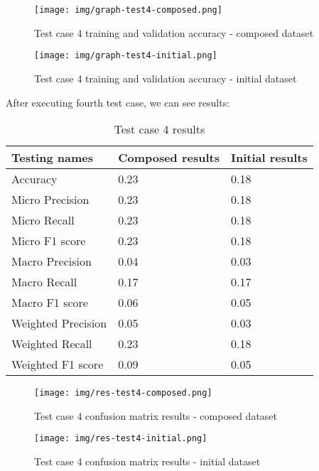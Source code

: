 \begin{figure}[H]
    \centerline{\texttt{[image: img/graph-test4-composed.png]}}
    \caption{Test case 4 training and validation accuracy - composed dataset}
\end{figure}
\begin{figure}[H]
    \centerline{\texttt{[image: img/graph-test4-initial.png]}}
    \caption{Test case 4 training and validation accuracy - initial dataset}
\end{figure}

\newpage
After executing fourth test case, we can see results:
\begin{table}[!ht]
  \centering
    \begin{tabular}{ |m{14em}|m{9em}|m{9em}| } 
     \hline
        Testing names & Composed results & Initial results \\ 
     \hline
        Accuracy & 0.23 & 0.18 \\
     \hline
        Micro Precision & 0.23 & 0.18 \\
     \hline
        Micro Recall & 0.23 & 0.18 \\
     \hline
        Micro F1 score & 0.23 & 0.18 \\
     \hline
        Macro Precision & 0.04 & 0.03 \\
     \hline
        Macro Recall & 0.17 & 0.17 \\
     \hline
        Macro F1 score & 0.06 & 0.05 \\
     \hline
        Weighted Precision & 0.05 & 0.03 \\
     \hline
        Weighted Recall & 0.23 & 0.18 \\
     \hline
        Weighted F1 score & 0.09 & 0.05 \\
     \hline
    \end{tabular}
\caption{Test case 4 results}
\end{table}

\begin{figure}[H]
    \centerline{\texttt{[image: img/res-test4-composed.png]}}
    \caption{Test case 4 confusion matrix results - composed dataset}
\end{figure}
\begin{figure}[H]
    \centerline{\texttt{[image: img/res-test4-initial.png]}}
    \caption{Test case 4 confusion matrix results - initial dataset}
\end{figure}

